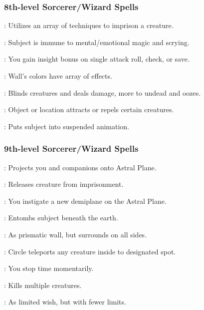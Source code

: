 \subsubsection{8th-level Sorcerer/Wizard Spells}
\begin{list}{}{\leftmargin=1em}
\item {}: Utilizes an array of techniques to imprison a creature.
\item {}: Subject is immune to mental/emotional magic and scrying.
\item {}: You gain insight bonus on single attack roll, check, or save.
\item {}: Wall's colors have array of effects.
\item {}: Blinds creatures and deals damage, more to undead and oozes.
\item {}: Object or location attracts or repels certain creatures.
\item {}: Puts subject into suspended animation.
\end{list}
\subsubsection{9th-level Sorcerer/Wizard Spells}
\begin{list}{}{\leftmargin=1em}
\item {}: Projects you and companions onto Astral Plane.
\item {}: Releases creature from imprisonment.
\item {}: You instigate a new demiplane on the Astral Plane.
\item {}: Entombs subject beneath the earth.
\item {}: As prismatic wall, but surrounds on all sides.
\item {}: Circle teleports any creature inside to designated spot.
\item {}: You stop time momentarily.
\item {}: Kills multiple creatures.
\item {}: As limited wish, but with fewer limits.
\end{list}
